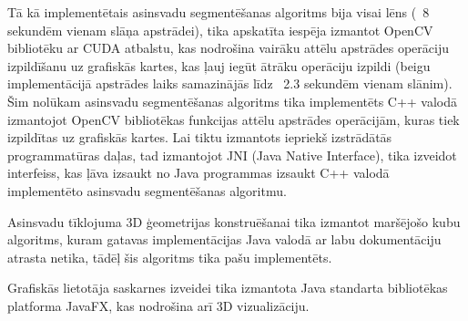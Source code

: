 Tā kā implementētais asinsvadu segmentēšanas algoritms bija visai lēns (~8 sekundēm vienam slāņa apstrādei), tika apskatīta iespēja izmantot OpenCV bibliotēku ar CUDA atbalstu, kas nodrošina vairāku attēlu apstrādes operāciju izpildīšanu uz grafiskās kartes, kas ļauj iegūt ātrāku operāciju izpildi (beigu implementācijā apstrādes laiks samazinājās līdz ~2.3 sekundēm vienam slānim). Šim nolūkam asinsvadu segmentēšanas algoritms tika implementēts C++ valodā izmantojot OpenCV bibliotēkas funkcijas attēlu apstrādes operācijām, kuras tiek izpildītas uz grafiskās kartes. Lai tiktu izmantots iepriekš izstrādātās programmatūras daļas, tad izmantojot JNI (Java Native Interface), tika izveidot interfeiss, kas ļāva izsaukt no Java programmas izsaukt C++ valodā implementēto asinsvadu segmentēšanas algoritmu.

Asinsvadu tīklojuma 3D ģeometrijas konstruēšanai tika izmantot maršējošo kubu algoritms, kuram gatavas implementācijas Java valodā ar labu dokumentāciju atrasta netika, tādēļ šis algoritms tika pašu implementēts.

Grafiskās lietotāja saskarnes izveidei tika izmantota Java standarta bibliotēkas platforma JavaFX, kas nodrošina arī 3D vizualizāciju.